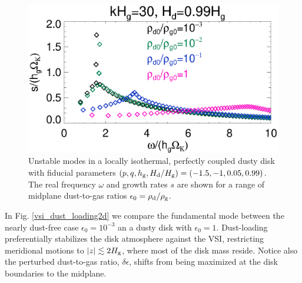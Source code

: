 \begin{figure}
  \includegraphics[width=\linewidth]{figures/compare_eigenvals_kx30Hd1} 
  \caption{Unstable modes in a locally isothermal, perfectly coupled
    dusty disk with fiducial parameters
    $(p,q,h_\mathrm{g}, H_\mathrm{d}/H_\mathrm{g} )=(-1.5,-1,0.05, 0.99)$. The real
    frequency $\omega$ and growth rates $s$ are shown for a range of
    midplane dust-to-gas ratios $\epsilon_0=\rho_\mathrm{d}/\rho_\mathrm{g}$. 
    \label{vsi_dust_loading}
    }
\end{figure}

In Fig. \ref{vsi_dust_loading2d}
we compare the fundamental mode between the nearly 
dust-free case $\epsilon_0=10^{-3}$ an a dusty disk with
$\epsilon_0=1$. Dust-loading preferentially
stabilizes the disk atmosphere against the VSI, restricting
meridional motions to $|z|\lesssim 2H_\mathrm{g}$, where most of the disk mass
reside. Notice also the perturbed dust-to-gas ratio,
$\delta\epsilon$, shifts from being maximized at the disk boundaries
to the midplane. 

